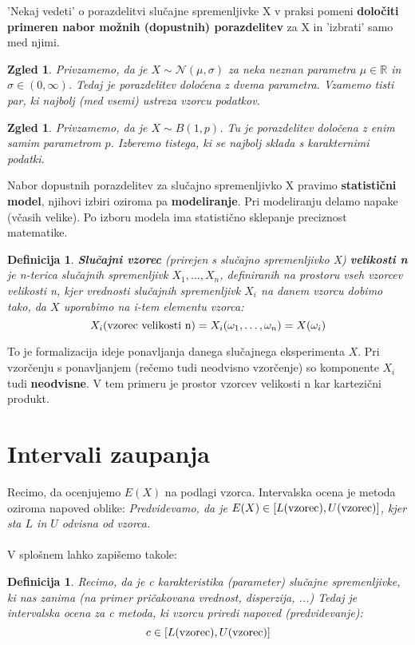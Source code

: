 \documentclass[11pt]{article}
\newtheorem{Definicija}[Izrek]{{\sc Definicija}}
\newtheorem{Zgled}[Izrek]{{\sc Zgled}}
\begin{document}
'Nekaj vedeti' o porazdelitvi slučajne spremenljivke X v praksi pomeni \textbf{določiti primeren nabor možnih (dopustnih) porazdelitev} za X in 'izbrati' samo med njimi.
\begin{Zgled}
	Privzamemo, da je $X\sim \mathcal{N}(\mu, \sigma)$ za neka neznan parametra  $\mu \in \mathbb{R}$ in $\sigma\in(0, \infty)$. Tedaj je porazdelitev doloćena z dvema parametra. Vzamemo tisti par, ki najbolj (med vsemi) ustreza vzorcu podatkov.
\end{Zgled}		
\begin{Zgled}
	Privzamemo, da je $X\sim B(1,p)$. Tu je porazdelitev določena  z enim samim parametrom $p$. Izberemo tistega, ki se najbolj sklada s karakternimi podatki.
\end{Zgled}

Nabor dopustnih porazdelitev za slučajno spremenljivko X pravimo \textbf{statistični model}, njihovi izbiri oziroma pa \textbf{modeliranje}. Pri modeliranju delamo napake (včasih velike). Po izboru modela ima statistično sklepanje preciznost matematike.
\begin{Definicija}
	\textbf{Slučajni vzorec} (prirejen s slučajno spremenljivko X) \textbf{velikosti n} je n-terica slučajnih spremenljivk $X_1, \ldots, X_n$, definiranih na prostoru vseh vzorcev velikosti n, kjer vrednosti slučajnih spremenljivk $X_i$ na danem vzorcu dobimo tako, da $X$ uporabimo na i-tem elementu vzorca:
	$$X_i(\textnormal{vzorec velikosti n}) = X_i(\omega_1, \ldots,\omega_n) = X(\omega_i)$$
\end{Definicija}
To je formalizacija ideje ponavljanja danega slučajnega eksperimenta $X$. Pri vzorčenju s ponavljanjem (rečemo tudi neodvisno vzorčenje) so komponente $X_i$ tudi \textbf{neodvisne}. V tem primeru je prostor vzorcev velikosti n kar kartezični produkt.


\section{Intervali zaupanja}
Recimo, da ocenjujemo $E(X)$ na podlagi vzorca. Intervalska ocena je metoda oziroma napoved oblike:
\textit{Predvidevamo, da je $E(X) \in [L(\textnormal{vzorec}), U(\textnormal{vzorec})]$, kjer sta $L$ in $U$ odvisna od vzorca. }
\\
\\
V splošnem lahko zapišemo takole:
\\
\begin{Definicija}
	Recimo, da je c karakteristika (parameter) slučajne spremenljivke, ki nas zanima (na primer pričakovana vrednost, disperzija, ...)
	Tedaj je intervalska ocena za c metoda, ki vzorcu priredi napoved
	(predvidevanje):
	$$c\in [L(\textnormal{vzorec}), U(\textnormal{vzorec})]$$
\end{Definicija}
\end{document}
